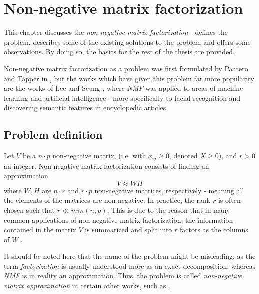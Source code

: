 \documentclass[thesis=M,english]{FITthesis}[2012/10/20]
\begin{document}
\chapter{Non-negative matrix factorization}
\label{ch:NMF}
This chapter discusses the \emph{non-negative matrix factorization} - defines
the problem, describes some of the existing solutions to the problem and
offers some observations. By doing so, the basics for the rest of the thesis are
provided.

Non-negative matrix factorization as a problem was first formulated by Paatero
and Tapper in \cite{nmf-paatero}, but the works which have given
this problem far more popularity are the works of Lee and Seung \cite{lee99}, where
\emph{NMF} was applied to areas of machine learning and artificial
intelligence - more specifically to facial recognition and discovering semantic
features in encyclopedic articles.

\section{Problem definition}
Let $V$ be a $n \cdot p$ non-negative matrix, (i.e. with $x_{ij} \geq 0$, denoted
$X \geq 0$), and $r > 0$ an integer. Non-negative matrix factorization consists of
finding an approximation
\begin{equation}
  V \approx WH
\end{equation}
where $W, H$ are $n \cdot r$ and $r \cdot p$ non-negative matrices, respectively - meaning
all the elements of the matrices are non-negative.
In practice, the rank $r$ is often chosen such that $r \ll min(n,p)$. This is due
to the reason that in many common applications of non-negative matrix factorization,
the information contained in the matrix $V$ is summarized and split into $r$ factors
as the columns of $W$ \cite{nmf-r-vignette}.

It should be noted here that the name of the problem might be misleading, as
the term \emph{factorization} is usually understood more as an exact
decomposition, whereas \emph{NMF} is in reality an approximation. Thus,
the problem is called \emph{non-negative matrix approximation} in certain
other works, such as \cite{nmf-approx}.
\end{document}
